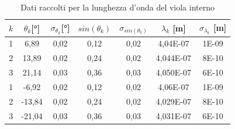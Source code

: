 \documentclass{article}
\begin{document}
        \begin{table}[H]

            \centering

            \begin{tabular}{c c c c c c c}

                \toprule 
                $k$ & $\theta_k$[°] & $\sigma_{\theta_k}$[°] & $sin(\theta_k)$ & $\sigma_{sin(\theta_k)}$ & $\lambda_k$ [m] & $\sigma_{\lambda_k}$ [m] \\
                
                \midrule
                1	&	6,89	&	0,02	&	0,12	&	0,02	&	4,04E-07	&	1E-09\\
                2	&	13,89	&	0,02	&	0,24	&	0,02	&	4,044E-07	&	8E-10\\
                3	&	21,14	&	0,03	&	0,36	&	0,03	&	4,050E-07	&	6E-10\\
                1	&	-6,92	&	0,02	&	0,12	&	0,02	&	4,06E-07	&	1E-09\\
                2	&	-13,84	&	0,02	&	0,24	&	0,02	&	4,029E-07	&	8E-10\\
                3	&	-21,04	&	0,03	&	0,36	&	0,03	&	4,031E-07	&	6E-10\\
                \bottomrule

            \end{tabular}

            \caption{Dati raccolti per la lunghezza d'onda del viola interno}
            
        \end{table} 
        \label{table:viola int}
\end{document}
